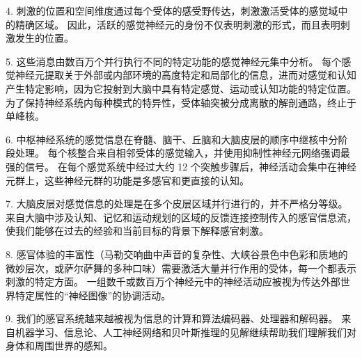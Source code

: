 4. 刺激的位置和空间维度通过每个受体的感受野传达，刺激激活受体的感觉域中的精确区域。
因此，活跃的感觉神经元的身份不仅表明刺激的形式，而且表明刺激发生的位置。

5. 这些消息由数百万个并行执行不同的特定功能的感觉神经元集中分析。
每个感觉神经元提取关于外部或内部环境的高度特定和局部化的信息，进而对感觉和认知产生特定影响，因为它投射到大脑中具有特定感觉、运动或认知功能的特定位置。
为了保持神经系统内每种模式的特异性，受体轴突被分成离散的解剖通路，终止于单峰核。


6. 中枢神经系统的感觉信息在脊髓、脑干、丘脑和大脑皮层的顺序中继核中分阶段处理。
每个核整合来自相邻受体的感觉输入，并使用抑制性神经元网络强调最强的信号。
在每个感觉系统中经过大约 12 个突触步骤后，神经活动会集中在神经元群上，这些神经元群的功能是多感官和更直接的认知。


7. 大脑皮层对感觉信息的处理是在多个皮层区域并行进行的，并不严格分等级。 
来自大脑中涉及认知、记忆和运动规划的区域的反馈连接控制传入的感官信息流，使我们能够在过去的经验和当前目标的背景下解释感官刺激。


8. 感官体验的丰富性（马勒交响曲中声音的复杂性、大峡谷景色中色彩和质地的微妙层次，或萨尔萨舞的多种口味）需要激活大量并行作用的受体，每一个都表示刺激的特定方面。 
一组数千或数百万个神经元中的神经活动应被视为传达外部世界特定属性的“神经图像”的协调活动。 


9. 我们的感官系统越来越被视为信息的计算和算法编码器、处理器和解码器。 
来自机器学习、信息论、人工神经网络和贝叶斯推理的见解继续帮助我们理解我们对身体和周围世界的感知。

